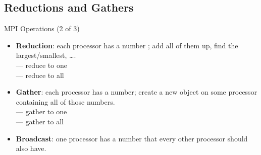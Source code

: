 \subsection{Reductions and Gathers}

\begin{frame}[shrink]
  \begin{block}{MPI Operations (2 of 3)}\pause
    \begin{itemize}
      \item \textbf{Reduction}:  each processor has a number ; add all of them up, find the largest/smallest, \dots .\\
       --- reduce to one\\
       --- reduce to all\\[.4cm]
      \item \textbf{Gather}: each processor has a number; create a new object on some processor containing all of those numbers.\\
       --- gather to one\\
       --- gather to all\\[.4cm]
      \item \textbf{Broadcast}: one processor has a number  that every other processor should also have.\\
      \\[.4cm]
    \end{itemize}
  \end{block}
\end{frame}



